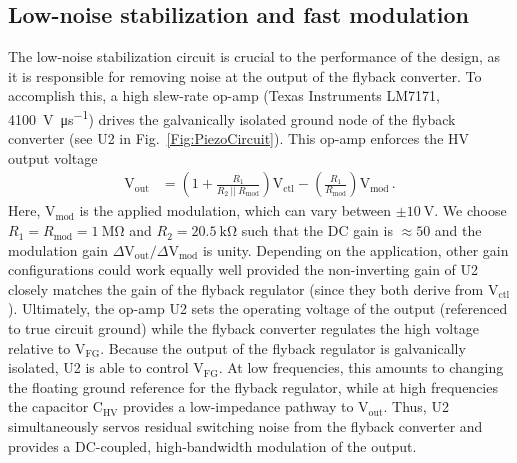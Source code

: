 \documentclass[aip,rsi,reprint]{revtex4-1} %
\begin{document}
\subsection{Low-noise stabilization and fast modulation}
\label{Sec:LowNoiseStabilization}

The low-noise stabilization circuit is crucial to the performance of the design, as it is responsible for removing noise at the output of the flyback converter.
To accomplish this, a high slew-rate op-amp (Texas Instruments LM7171, \SI[per-mode=symbol]{4100}{\volt\per\micro\second}) drives the galvanically isolated ground node of the flyback converter (see U2 in Fig.~\ref{Fig:PiezoCircuit}).
This op-amp enforces the HV output voltage
\begin{align}
\text{V}_\text{out} &= \left(1 + \frac{R_1}{R_2~||~R_\text{mod}}\right) \text{V}_\text{ctl} -
\left(\frac{R_1}{R_\text{mod}}\right) \text{V}_\text{mod}\,.
\label{Eq:FullTransferFunc}
\end{align}
Here, $\text{V}_\text{mod}$ is the applied modulation, which can vary between $\pm\SI{10}{\volt}$.
We choose $R_1 = R_\text{mod} = \SI{1}{\mega\ohm}$ and $R_2 = \SI{20.5}{\kilo\ohm}$ such that the DC gain is $\approx 50$ and the modulation gain $\Delta\text{V}_\text{out}/\Delta\text{V}_\text{mod}$ is unity.
Depending on the application, other gain configurations could work equally well provided the non-inverting gain of U2 closely matches the gain of the flyback regulator (since they both derive from $\text{V}_\text{ctl}$).
Ultimately, the op-amp U2 sets the operating voltage of the output (referenced to true circuit ground) while the flyback converter regulates the high voltage relative to $\text{V}_\text{FG}$.
Because the output of the flyback regulator is galvanically isolated, U2 is able to control $\text{V}_\text{FG}$. 
At low frequencies, this amounts to changing the floating ground reference for the flyback regulator, while at high frequencies the capacitor $\text{C}_\text{HV}$ provides a low-impedance pathway to $\text{V}_\text{out}$.
Thus, U2 simultaneously servos residual switching noise from the flyback converter and provides a DC-coupled, high-bandwidth modulation of the output.
\end{document}
